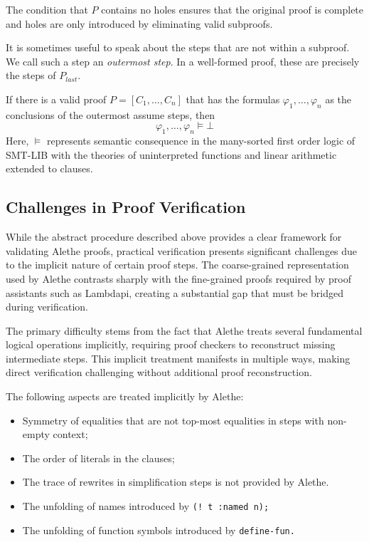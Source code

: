 The condition that $P$ contains no holes ensures that the original proof is
complete and holes are only introduced by eliminating valid subproofs.

It is sometimes useful to speak about the steps that are not within a subproof.
We call such a step an \emph{outermost step}. In a well-formed proof, these are precisely the steps of $P_{\mathit{last}}$.

\begin{theorem}
If there is a valid proof $P = [C_1, \dots , C_n]$ that has the formulas $\varphi_1, \dots, \varphi_n$ as the conclusions of the outermost assume steps, then
\[
  \varphi_1, \dots, \varphi_n \models \bot
\]
Here, $\models$ represents semantic consequence in the many-sorted first order logic of SMT-LIB with the theories of uninterpreted functions and linear arithmetic extended to clauses.
\end{theorem}

\subsection{Challenges in Proof Verification}
\label{ssec:challenge-recon}

While the abstract procedure described above provides a clear framework for validating Alethe proofs,
practical verification presents significant challenges due to the implicit nature of certain proof steps.
The coarse-grained representation used by Alethe contrasts sharply with the fine-grained proofs required
by proof assistants such as Lambdapi, creating a substantial gap that must be bridged during verification.

The primary difficulty stems from the fact that Alethe treats several fundamental logical operations
implicitly, requiring proof checkers to reconstruct missing intermediate steps. This implicit treatment
manifests in multiple ways, making direct verification challenging without additional proof reconstruction.

The following aspects are treated implicitly by Alethe:

\begin{itemize}
  \item Symmetry of equalities that are not top-most equalities in steps with non-empty context;
  \item The order of literals in the clauses;
  \item The trace of rewrites in simplification steps is not provided by Alethe. 
  \item The unfolding of names introduced by \tt{(! t :named n)};
  \item The unfolding of function symbols introduced by \tt{define-fun}.
\end{itemize}

